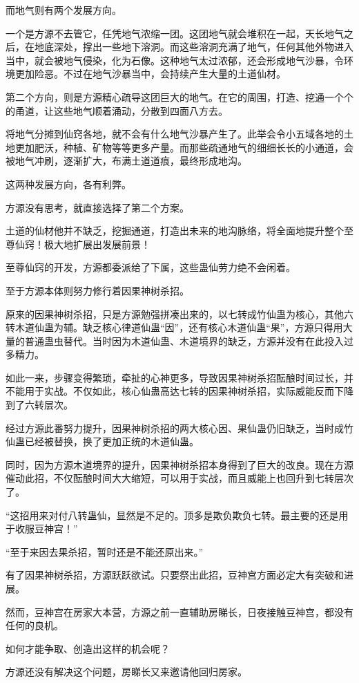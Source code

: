 \begin{this_body}
而地气则有两个发展方向。

一个是方源不去管它，任凭地气浓缩一团。这团地气就会堆积在一起，天长地气之后，在地底深处，撑出一些地下溶洞。而这些溶洞充满了地气，任何其他外物进入当中，就会被地气侵染，化为石像。这种地气太过浓郁，还会形成地气沙暴，令环境更加险恶。不过在地气沙暴当中，会持续产生大量的土道仙材。

第二个方向，则是方源精心疏导这团巨大的地气。在它的周围，打造、挖通一个个的甬道，让这些地气顺着涌动，分散到四面八方去。

将地气分摊到仙窍各地，就不会有什么地气沙暴产生了。此举会令小五域各地的土地更加肥沃，种植、矿物等等更多产量。而那些疏通地气的细细长长的小通道，会被地气冲刷，逐渐扩大，布满土道道痕，最终形成地沟。

这两种发展方向，各有利弊。

方源没有思考，就直接选择了第二个方案。

土道的仙材他并不缺乏，挖掘通道，打造出未来的地沟脉络，将全面地提升整个至尊仙窍！极大地扩展出发展前景！

至尊仙窍的开发，方源都委派给了下属，这些蛊仙劳力绝不会闲着。

至于方源本体则努力修行着因果神树杀招。

原来的因果神树杀招，只是方源勉强拼凑出来的，以七转成竹仙蛊为核心，其他六转木道仙蛊为辅。缺乏核心律道仙蛊“因”，还有核心木道仙蛊“果”，方源只得用大量的普通蛊虫替代。当时因为木道仙蛊、木道境界的缺乏，方源并没有在此投入过多精力。

如此一来，步骤变得繁琐，牵扯的心神更多，导致因果神树杀招酝酿时间过长，并不能用于实战。不仅如此，核心仙蛊高达七转的因果神树杀招，实际威能反而下降到了六转层次。

经过方源此番努力提升，因果神树杀招的两大核心因、果仙蛊仍旧缺乏，当时成竹仙蛊已经被替换，换了更加正统的木道仙蛊。

同时，因为方源木道境界的提升，因果神树杀招本身得到了巨大的改良。现在方源催动此招，不仅酝酿时间大大缩短，可以用于实战，而且威能上也回升到七转层次了。

“这招用来对付八转蛊仙，显然是不足的。顶多是欺负欺负七转。最主要的还是用于收服豆神宫！”

“至于来因去果杀招，暂时还是不能还原出来。”

有了因果神树杀招，方源跃跃欲试。只要祭出此招，豆神宫方面必定大有突破和进展。

然而，豆神宫在房家大本营，方源之前一直辅助房睇长，日夜接触豆神宫，都没有任何的良机。

如何才能争取、创造出这样的机会呢？

方源还没有解决这个问题，房睇长又来邀请他回归房家。


\end{this_body}
